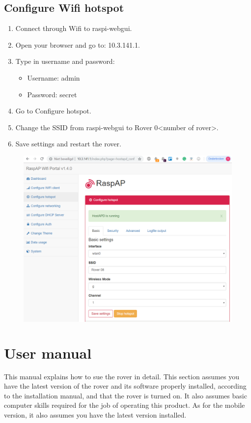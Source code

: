 \documentclass[12pt]{article}
\begin{document}
	\subsection{Configure Wifi hotspot}
	\begin{enumerate}
		\item Connect through Wifi to raspi-webgui.
		\item Open your browser and go to: 10.3.141.1.
		\item Type in username and password:
		\begin{itemize}
			\item Username: admin
			\item Password: secret
		\end{itemize}
		\item Go to Configure hotspot.
		\item Change the SSID from raspi-webgui to Rover 0<number of rover>.
		\item Save settings and restart the rover.
	\end{enumerate}
	\begin{figure}[H]
		\includegraphics[width=\columnwidth]{InstallManual.png}
	\end{figure}
	\newpage
 	\section{User manual}
 	This manual explains how to sue the rover in detail. This section assumes you have the latest version of the rover and its software properly installed, according to the installation manual, and that the rover is turned on. It also assumes basic computer skills required for the job of operating this product. As for the mobile version, it also assumes you have the latest version installed.
\end{document}
